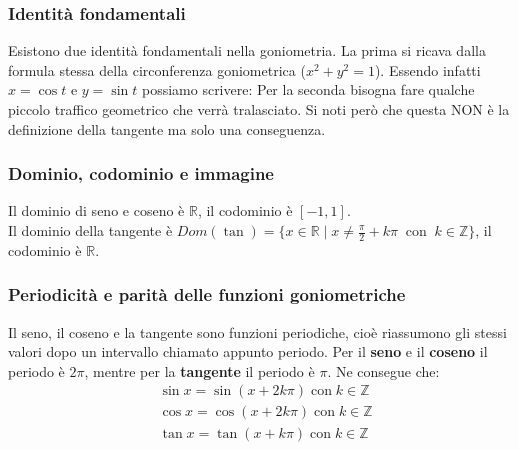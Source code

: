 


\subsubsection{Identità fondamentali}
Esistono due identità fondamentali nella goniometria. La prima si ricava dalla formula stessa della circonferenza goniometrica ($x^2+y^2=1$). Essendo infatti $x = \cos{t}$ e $y = \sin{t}$ possiamo scrivere:
Per la seconda bisogna fare qualche piccolo traffico geometrico che verrà tralasciato. Si noti però che questa NON è la definizione della tangente ma solo una conseguenza.

\subsubsection{Dominio, codominio e immagine}
Il dominio di seno e coseno è $\mathbb{R}$, il codominio è $[-1, 1]$.\\
Il dominio della tangente è $Dom(\tan) = \{x \in \mathbb{R}\; |\; x \neq \frac{\pi}{2} + k\pi\;\; \mathrm{con}\;\; k \in \mathbb{Z}\}$, il codominio è $\mathbb{R}$.

\subsubsection{Periodicità e parità delle funzioni goniometriche}

Il seno, il coseno e la tangente sono funzioni periodiche, cioè riassumono gli stessi valori dopo un intervallo chiamato appunto periodo. Per il \textbf{seno} e il \textbf{coseno} il periodo è $2\pi$, mentre per la \textbf{tangente} il periodo è $\pi$. Ne consegue che:
\begin{align*}
    &\sin{x} = \sin{(x + 2k\pi)}\; \mathrm{con}\; k\in \mathbb{Z}\\
    &\cos{x} = \cos{(x + 2k\pi)}\; \mathrm{con}\; k\in \mathbb{Z}\\
    &\tan{x} = \tan{(x + k\pi)}\; \mathrm{con}\; k\in \mathbb{Z}\\
\end{align*}

